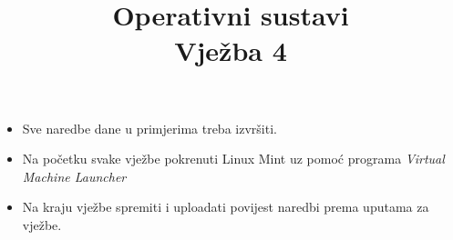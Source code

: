 \documentclass[a4paper,12pt]{article}
\title
{Operativni sustavi\\
Vježba 4}
\date{}
\begin{document}
\maketitle
\begin{itemize}


\item Sve naredbe dane u primjerima treba izvršiti.
\item Na početku svake vježbe pokrenuti Linux Mint uz pomoć programa \textit{Virtual Machine Launcher}
\item Na kraju vježbe spremiti i uploadati povijest naredbi prema uputama za vježbe.

\end{itemize}

\end{document}
